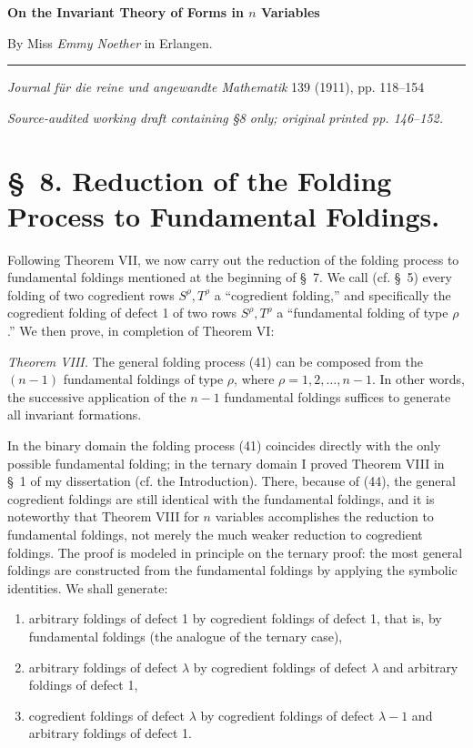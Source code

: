 \documentclass[10pt]{article}
\begin{document}
\begin{center}
{\Large\bfseries On the Invariant Theory of Forms in $n$ Variables}\par
\vspace{0.5em}
By Miss \emph{Emmy Noether} in Erlangen.\par
\medskip
\rule{0.22\linewidth}{0.4pt}\par
\vspace{0.7em}
\emph{Journal f\"ur die reine und angewandte Mathematik} 139 (1911), pp. 118--154\par
\smallskip
{\small\itshape Source-audited working draft containing \S8 only; original printed pp. 146--152.}
\end{center}

\section*{\S\ 8. Reduction of the Folding Process to Fundamental Foldings.}

Following Theorem VII, we now carry out the reduction of the folding process
to fundamental foldings mentioned at the beginning of \S\ 7. We call (cf.
\S\ 5) every folding of two cogredient rows $S^\rho,T^\rho$ a ``cogredient
folding,'' and specifically the cogredient folding of defect 1 of two rows
$S^\rho,T^\rho$ a ``fundamental folding of type $\rho$.'' We then prove, in
completion of Theorem VI:

\emph{Theorem VIII.} The general folding process (41) can be composed from
the $(n-1)$ fundamental foldings of type $\rho$, where
$\rho=1,2,\ldots,n-1$. In other words, the successive application of the
$n-1$ fundamental foldings suffices to generate all invariant formations.

In the binary domain the folding process (41) coincides directly with the
only possible fundamental folding; in the ternary domain I proved Theorem
VIII in \S\ 1 of my dissertation (cf. the Introduction). There, because of
(44), the general cogredient foldings are still identical with the
fundamental foldings, and it is noteworthy that Theorem VIII for $n$
variables accomplishes the reduction to fundamental foldings, not merely
the much weaker reduction to cogredient foldings. The proof is modeled in
principle on the ternary proof: the most general foldings are constructed
from the fundamental foldings by applying the symbolic identities. We shall
generate:
\begin{enumerate}
\item arbitrary foldings of defect 1 by cogredient foldings of defect 1,
that is, by fundamental foldings (the analogue of the ternary case),
\item arbitrary foldings of defect $\lambda$ by cogredient foldings of
defect $\lambda$ and arbitrary foldings of defect 1,
\item cogredient foldings of defect $\lambda$ by cogredient foldings of
defect $\lambda-1$ and arbitrary foldings of defect 1.
\end{enumerate}
\end{document}

